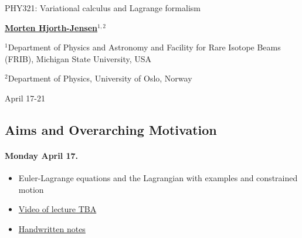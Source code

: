 \documentclass[%
oneside,                 %
final,                   %
10pt]{article}
\begin{document}

\newcommand{\exercisesection}[1]{\subsection*{#1}}






\thispagestyle{empty}

\begin{center}
{\LARGE\bf
\begin{spacing}{1.25}
PHY321: Variational calculus and Lagrange formalism
\end{spacing}
}
\end{center}


\begin{center}
{\bf \href{{http://mhjgit.github.io/info/doc/web/}}{Morten Hjorth-Jensen}${}^{1, 2}$} \\ [0mm]
\end{center}

\begin{center}
\centerline{{\small ${}^1$Department of Physics and Astronomy and Facility for Rare Isotope Beams (FRIB), Michigan State University, USA}}
\centerline{{\small ${}^2$Department of Physics, University of Oslo, Norway}}
\end{center}
    

\begin{center}
April 17-21
\end{center}

\vspace{1cm}


\subsection{Aims and Overarching Motivation}

\paragraph{Monday April 17.}
\begin{itemize}
\item Euler-Lagrange equations and the Lagrangian with examples and constrained motion

\item \href{{https://youtu.be/}}{Video of lecture TBA}

\item \href{{https://github.com/mhjensen/Physics321/blob/master/doc/HandWrittenNotes/Spring2023/NotesApril17.pdf}}{Handwritten notes}
\end{itemize}
\end{document}
